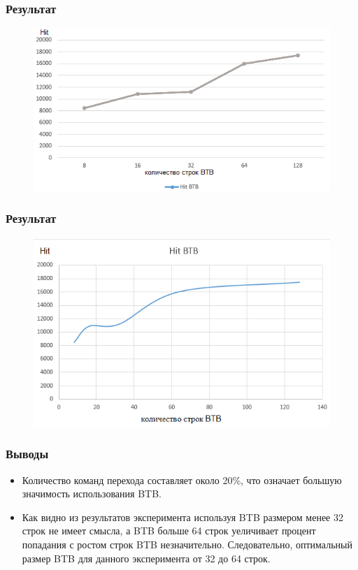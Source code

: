 \documentclass{beamer}
\begin{document}
\begin{frame}
\frametitle{Результат}

\begin{figure}
\includegraphics[scale=0.8]{Pic_8}
\end{figure}

\end{frame}

\begin{frame}
\frametitle{Результат}

\begin{figure}
\includegraphics[scale=0.8]{Pic_7}
\end{figure}


\end{frame}


\begin{frame}
\frametitle{Выводы}

\begin{itemize}
\item Количество команд перехода составляет около 20\%, что означает большую значимость использования BTB.
\item Как видно из результатов эксперимента используя BTB размером менее 32 строк не имеет смысла, а BTB больше 64 строк уеличивает процент попадания с ростом строк BTB незначительно. Следовательно, оптимальный размер BTB для данного эксперимента от 32 до 64 строк.
\end{itemize}

\end{frame}
\end{document}
